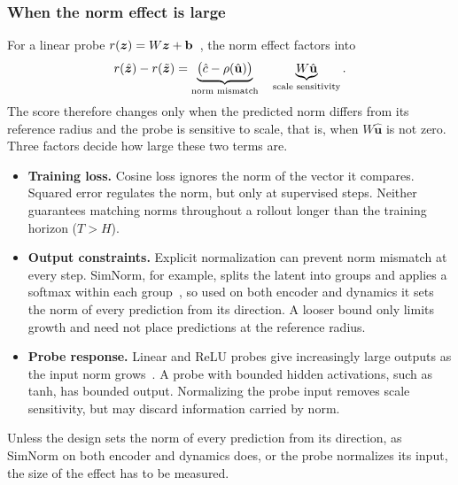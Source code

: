 \subsubsection{When the norm effect is large}
\label{sec:loss}
\label{sec:arch_constraint}
\label{sec:readout}
For a linear probe $r(\bm{z})=W\bm{z}+\mathbf b$~\citep{alain2016understanding,Hewitt2019ControlTasks}, the norm effect factors into
\begin{equation}
r(\hat{\bm{z}})-r(\tilde{\bm{z}})
=\underbrace{\bigl(\hat c-\rho(\hat{\mathbf u})\bigr)}_{\text{norm mismatch}}\quad
\underbrace{W\hat{\mathbf u}}_{\text{scale sensitivity}} .
\label{eq:linear_norm_effect}
\end{equation}
The score therefore changes only when the predicted norm differs from its reference radius and the probe is sensitive to scale, that is, when $W\hat{\mathbf u}$ is not zero. Three factors decide how large these two terms are.
\begin{itemize}
\item \textbf{Training loss.} Cosine loss ignores the norm of the vector it compares. Squared error regulates the norm, but only at supervised steps. Neither guarantees matching norms throughout a rollout longer than the training horizon ($T>H$).
\item \textbf{Output constraints.} Explicit normalization can prevent norm mismatch at every step. SimNorm, for example, splits the latent into groups and applies a softmax within each group~\citep{Hansen2023}, so used on both encoder and dynamics it sets the norm of every prediction from its direction. A looser bound only limits growth and need not place predictions at the reference radius.
\item \textbf{Probe response.} Linear and ReLU probes give increasingly large outputs as the input norm grows~\citep{Hein2019ReLU,Xu2021Extrapolate}. A probe with bounded hidden activations, such as tanh, has bounded output. Normalizing the probe input removes scale sensitivity, but may discard information carried by norm.
\end{itemize}

Unless the design sets the norm of every prediction from its direction, as SimNorm on both encoder and dynamics does, or the probe normalizes its input, the size of the effect has to be measured.

